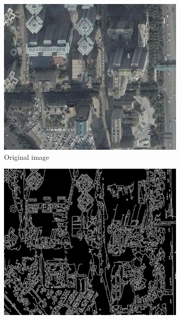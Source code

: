\documentclass[conference]{IEEEtran}
\begin{document}
\begin{figure}
  \begin{center}
    \begin{subfigure}[b]{0.48\linewidth}
        \centerline{\includegraphics[width=\linewidth]{MedianNorm_a.jpg}}
        \caption{Original image \label{subfig:median_orig}}
    \end{subfigure}
    \end{center}
     \begin{subfigure}[b]{0.48\linewidth}
        \centerline{\includegraphics[width=\linewidth]{MedianNoPre_b.jpg}}

\end{subfigure}
\end{figure}
\end{document}
